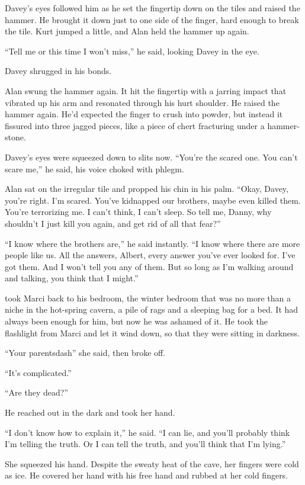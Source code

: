 Davey's eyes followed him as he set the fingertip down on the tiles
and raised the hammer.  He brought it down just to one side of the
finger, hard enough to break the tile.  Kurt jumped a little, and Alan
held the hammer up again.

``Tell me or this time I won't miss,'' he said, looking Davey in the
eye.

Davey shrugged in his bonds.

Alan swung the hammer again.  It hit the fingertip with a jarring
impact that vibrated up his arm and resonated through his hurt
shoulder.  He raised the hammer again.  He'd expected the finger to
crush into powder, but instead it fissured into three jagged pieces,
like a piece of chert fracturing under a hammer-stone.

Davey's eyes were squeezed down to slits now.  ``You're the scared
one.  You can't scare me,'' he said, his voice choked with phlegm.

Alan sat on the irregular tile and propped his chin in his palm. 
``Okay, Davey, you're right.  I'm scared.  You've kidnapped our
brothers, maybe even killed them.  You're terrorizing me.  I can't
think, I can't sleep.  So tell me, Danny, why shouldn't I just kill
you again, and get rid of all that fear?''

``I know where the brothers are,'' he said instantly.  ``I know where
there are more people like us.  All the answers, Albert, every answer
you've ever looked for.  I've got them.  And I won't tell you any of
them.  But so long as I'm walking around and talking, you think that I
might.''

 took Marci back to his bedroom, the winter bedroom that was no
more than a niche in the hot-spring cavern, a pile of rags and a
sleeping bag for a bed.  It had always been enough for him, but now he
was ashamed of it.  He took the flashlight from Marci and let it wind
down, so that they were sitting in darkness.

``Your parentsdash{}'' she said, then broke off.

``It's complicated.''

``Are they dead?''

He reached out in the dark and took her hand.

``I don't know how to explain it,'' he said.  ``I can lie, and you'll
probably think I'm telling the truth.  Or I can tell the truth, and
you'll think that I'm lying.''

She squeezed his hand.  Despite the sweaty heat of the cave, her
fingers were cold as ice.  He covered her hand with his free hand and
rubbed at her cold fingers.

